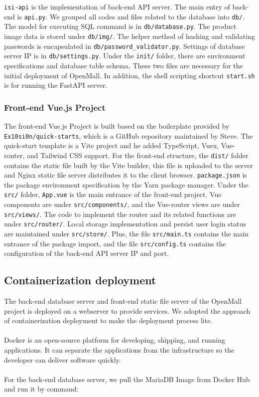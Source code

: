 \documentclass{article}
\begin{document}
\verb|isi-api| is the implementation of back-end API server. The main entry of back-end is \verb|api.py|. We grouped all codes and files related to the database into \verb|db/|. The model for executing SQL command is in \verb|db/database.py|. The product image data is stored under \verb|db/img/|. The helper method of hashing and validating passwords is encapsulated in \verb|db/password_validator.py|. Settings of database server IP is in \verb|db/settings.py|. Under the \verb|init/| folder, there are environment specifications and database table schema. These two files are necessary for the initial deployment of OpenMall. In addition, the shell scripting shortcut \verb|start.sh| is for running the FastAPI server.

\subsubsection{Front-end Vue.js Project}
The front-end Vue.js Project is built based on the boilerplate provided by \verb|Ex10si0n/quick-starts|, which is a GitHub repository maintained by Steve. The quick-start template is a Vite project and he added TypeScript, Vuex, Vue-router, and Tailwind CSS support. For the front-end structure, the \verb|dist/| folder contains the static file built by the Vite builder, this file is uploaded to the server and Nginx static file server distributes it to the client browser. \verb|package.json| is the package environment specification by the Yarn package manager. Under the \verb|src/| folder, \verb|App.vue| is the main entrance of the front-end project. Vue components are under \verb|src/components/|, and the Vue-router views are under \verb|src/views/|. The code to implement the router and its related functions are under \verb|src/router/|. Local storage implementation and persist user login status are maintained under \verb|src/store/|. Plus, the file \verb|src/main.ts| contains the main entrance of the package import, and the file \verb|src/config.ts| contains the configuration of the back-end API server IP and port.

\subsection{Containerization deployment}

The back-end database server and front-end static file server of the OpenMall project is deployed on a webserver to provide services. We adopted the approach of containerization deployment to make the deployment process lite. 
\\\\
Docker is an open-source platform for developing, shipping, and running applications. It can separate the applications from the infrastructure so the developer can deliver software quickly.
\\\\
For the back-end database server, we pull the MariaDB Image from Docker Hub and run it by command:
\end{document}
